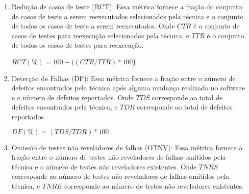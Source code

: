 \begin{itemize}
\begin{enumerate}[label=\bf M\arabic*,leftmargin=2.1cm]
        \item Redução de casos de teste (RCT): Essa métrica fornece a fração do conjunto de casos de teste a serem reexecutados selecionados pela técnica e o conjunto de todos os casos de teste a serem reexecutados. Onde \textbf{$CTR$} é o conjunto de casos de testes para reexecução selecionados pela técnica, e \textbf{$TTR$} é o conjunto de todos os casos de testes para reexecução.
        
        \begin{center}
        \noindent\fbox
        { 
            \parbox{.8\textwidth}
            {
                \begin{center}
            
                \textbf{$RCT (\%) = 100-(({CTR}/{TTR})*100$)}
    
                \end{center}
            }
        }
        \end{center}
        
        \item Detecção de Falhas (DF): Essa métrica fornece a fração entre o número de defeitos encontrados pela técnica após alguma mudança realizada no software e o número de defeitos reportados. Onde \textbf{$TDS$} corresponde ao total de defeitos encontrados pela técnica, e \textbf{$TDR$} corresponde ao total de defeitos reportados.
        
        \begin{center}
        \noindent\fbox
        { 
            \parbox{.8\textwidth}
            {
                \begin{center}
            
                \textbf{$DF (\%) = ({TDS}/{TDR})*100$}
    
                \end{center}
            }
        }
        \end{center}
        
        \item Omissão de testes não reveladores de falhas (OTNV): Essa métrica fornece a fração entre o número de testes não reveladores de falhas omitidos pela técnica e o número de testes não reveladores existentes. Onde \textbf{$TNRS$} corresponde ao número de testes não reveladores de falhas omitidos pela técnica, e \textbf{$TNRE$} corresponde ao número de testes não reveladores existentes.
        
        \begin{center}
        \noindent\fbox
        { 
            \parbox{.8\textwidth}
            {
                \begin{center}
            

\end{center}}}
\end{center}
\end{enumerate}
\end{itemize}
